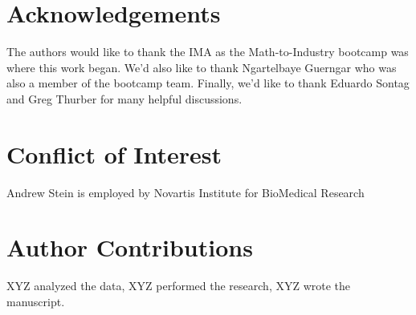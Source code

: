 \documentclass{article}
\begin{document}
\section*{Acknowledgements}
The authors would like to thank the IMA as the Math-to-Industry bootcamp was where this work began.  We'd also like to thank Ngartelbaye Guerngar who was also a member of the bootcamp team.  Finally, we'd like to thank Eduardo Sontag and Greg Thurber for many helpful discussions.

\section*{Conflict of Interest}
Andrew Stein is employed by Novartis Institute for BioMedical Research

\section*{Author Contributions}
XYZ analyzed the data, XYZ performed the research, XYZ wrote the manuscript.

% 
%


\end{document}
